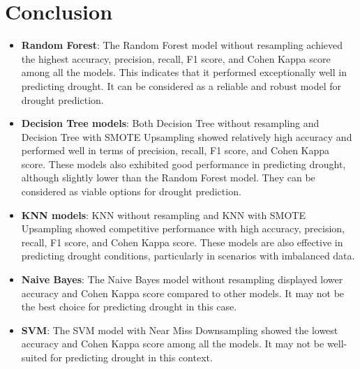 \documentclass{article}
\begin{document}
\section{Conclusion}
\begin{itemize}
    \item \textbf{Random Forest}: The Random Forest model without resampling achieved the highest accuracy, precision, recall, F1 score, and Cohen Kappa score among all the models. This indicates that it performed exceptionally well in predicting drought. It can be considered as a reliable and robust model for drought prediction.

    \item \textbf{Decision Tree models}: Both Decision Tree without resampling and Decision Tree with SMOTE Upsampling showed relatively high accuracy and performed well in terms of precision, recall, F1 score, and Cohen Kappa score. These models also exhibited good performance in predicting drought, although slightly lower than the Random Forest model. They can be considered as viable options for drought prediction.

    \item \textbf{KNN models}: KNN without resampling and KNN with SMOTE Upsampling showed competitive performance with high accuracy, precision, recall, F1 score, and Cohen Kappa score. These models are also effective in predicting drought conditions, particularly in scenarios with imbalanced data.

    \item \textbf{Naive Bayes}: The Naive Bayes model without resampling displayed lower accuracy and Cohen Kappa score compared to other models. It may not be the best choice for predicting drought in this case.

    \item \textbf{SVM}: The SVM model with Near Miss Downsampling showed the lowest accuracy and Cohen Kappa score among all the models. It may not be well-suited for predicting drought in this context.
\end{itemize}
\end{document}
